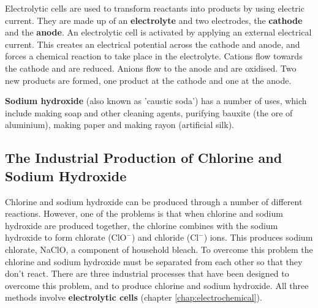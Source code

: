 Electrolytic cells are used to transform reactants into products by
using electric current. They are made up of an \textbf{electrolyte}
and two electrodes, the \textbf{cathode} and the \textbf{anode}. An
electrolytic cell is activated by applying an external electrical
current. This creates an electrical potential across the cathode and
anode, and forces a chemical reaction to take place in the
electrolyte. Cations flow towards the cathode and are reduced. Anions
flow to the anode and are oxidised. Two new products are formed, one
product at the cathode and one at the anode.

\textbf{Sodium hydroxide} (also known as 'caustic soda') has a number of uses, which include making soap and other cleaning agents, purifying bauxite (the ore of aluminium), making paper and making rayon (artificial silk).

\subsection{The Industrial Production of Chlorine and Sodium Hydroxide}

Chlorine and sodium hydroxide can be produced through a number of different reactions. However, one of the problems is that when chlorine and sodium hydroxide are produced together, the chlorine combines with the sodium hydroxide to form chlorate ($\text{ClO}^{-}$) and chloride ($\text{Cl}^{-}$) ions. This produces sodium chlorate, NaClO, a component of household bleach. To overcome this problem the chlorine and sodium hydroxide must be separated from each other so that they don't react. There are three industrial processes that have been designed to overcome this problem, and to produce chlorine and sodium hydroxide. All three methods involve \textbf{electrolytic cells} (chapter \ref{chap:electrochemical}). 
\\



